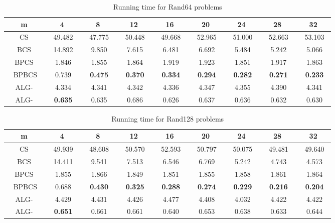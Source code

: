 \documentclass{llncs}
\newcommand{\rom}[1]{\uppercase\expandafter{\romannumeral #1\relax}}
\begin{document}
{\begin{table}
\begin{center}
\begin{tabular}{|c|c|c|c|c|c|c|c|c|}
\hline
m&4&8&12&16&20&24&28&32\\
\hline
CS &~ 49.482~ &~ 47.775~ &~ 50.448~ &~ 49.668~ &~ 52.965~ &~ 51.000~ &~ 52.663~ &~ 53.103~ \\
\hline
BCS &~ 14.892~ &~ 9.850~ &~ 7.615~ &~ 6.481~ &~ 6.692~ &~ 5.484~ &~ 5.242~ &~ 5.066~ \\
\hline
BPCS &~ 1.846~ &~ 1.855~ &~ 1.864~ &~ 1.919~ &~ 1.923~ &~ 1.851~ &~ 1.917~ &~ 1.863~ \\
\hline
~ BPBCS~ &~ 0.739~ &~ \textbf{0.475}~ &~ \textbf{0.370}~ &~ \textbf{0.334}~ &~ \textbf{0.294}~ &~ \textbf{0.282}~ &~ \textbf{0.271}~ &~ \textbf{0.233}~ \\
\hline
ALG-\rom{2} &~ 4.334~ &~ 4.341~ &~ 4.342~ &~ 4.336~ &~ 4.347~ &~ 4.355~ &~ 4.390~ &~ 4.341~ \\
\hline
ALG-\rom{1} &~ \textbf{0.635}~ &~ 0.635~ &~ 0.686~ &~ 0.626~ &~ 0.637~ &~ 0.636~ &~ 0.632~ &~ 0.630~ \\
\hline
\end{tabular}
\caption{Running time for Rand64 problems}
\label{Rand64}
\end{center}
\end{table}



\begin{table}
\begin{center}
\begin{tabular}{|c|c|c|c|c|c|c|c|c|}
\hline
m&4&8&12&16&20&24&28&32\\
\hline
CS &~ 49.939~ &~ 48.608~ &~ 50.570~ &~ 52.593~ &~ 50.797~ &~ 50.075~ &~ 49.481~ &~ 49.640~ \\
\hline
BCS &~ 14.411~ &~ 9.541~ &~ 7.513~ &~ 6.546~ &~ 6.769~ &~ 5.242~ &~ 4.743~ &~ 4.573~ \\
\hline
BPCS &~ 1.855~ &~ 1.866~ &~ 1.849~ &~ 1.851~ &~ 1.855~ &~ 1.858~ &~ 1.861~ &~ 1.864~ \\
\hline
~ BPBCS~ &~ 0.688~ &~ \textbf{0.430}~ &~ \textbf{0.325}~ &~ \textbf{0.288}~ &~ \textbf{0.274}~ &~ \textbf{0.229}~ &~ \textbf{0.216}~ &~ \textbf{0.204}~ \\
\hline
ALG-\rom{2} &~ 4.429~ &~ 4.431~ &~ 4.426~ &~ 4.477~ &~ 4.408~ &~ 4.032~ &~ 4.422~ &~ 4.422~ \\
\hline
ALG-\rom{1} &~ \textbf{0.651}~ &~ 0.661~ &~ 0.661~ &~ 0.640~ &~ 0.653~ &~ 0.638~ &~ 0.633~ &~ 0.644~ \\
\hline
\end{tabular}
\caption{Running time for Rand128 problems}
\label{Rand128}
\end{center}
\end{table}



}
\end{document}

